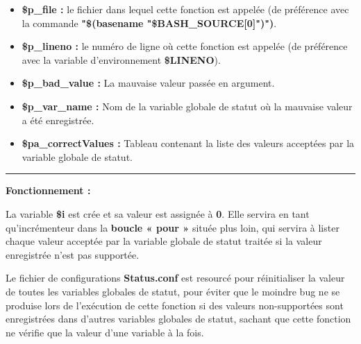 \documentclass[a4paper,10pt]{article}
\begin{document}
    \begin{justify}
        \begin{itemize}
            \item \textbf{\color{vars}\$p\_file\color{text} :} le fichier dans lequel cette fonction est appelée (de préférence avec la commande \textbf{\textbf{"\$(\color{cmds}basename \color{text}"\color{vars}\$BASH\_SOURCE[0]\color{text}")")}}.\setlength{\parskip}{1em}

            \item \textbf{\color{vars}\$p\_lineno\color{text} :} le numéro de ligne où cette fonction est appelée (de préférence avec la variable d'environnement \textbf{\color{vars}\$LINENO}).

            \item \textbf{\color{vars}\$p\_bad\_value\color{text} :} La mauvaise valeur passée en argument\color{text}.

            \item \textbf{\color{vars}\$p\_var\_name\color{text} :}  Nom de la variable globale de statut où la mauvaise valeur a été enregistrée.\color{text}

            \item \textbf{\color{vars}\$pa\_correctValues\color{text} :} Tableau contenant la liste des valeurs acceptées par la variable globale de statut.
        \end{itemize}
    \end{justify}

    \par\noindent\rule{\textwidth}{0.4pt}

    \begin{justify}
        \textbf{Fonctionnement :}

        La variable \textbf{\color{vars}\$i} est crée et sa valeur est assignée à \textbf{0}. Elle servira en tant qu'incrémenteur dans la \textbf{\color{loop}boucle « pour »} située plus loin, qui servira à lister chaque valeur acceptée par la variable globale de statut traitée si la valeur enregistrée n'est pas supportée.
    \end{justify}

    \setlength{\parskip}{2em}

    \begin{justify}
        Le fichier de configurations \textbf{\color{path}Status.conf} est resourcé pour réinitialiser la valeur de toutes les variables globales de statut, pour éviter que le moindre bug ne se produise lors de l'exécution de cette fonction si des valeurs non-supportées sont enregistrées dans d'autres variables globales de statut, sachant que cette fonction ne vérifie que la valeur d'une variable à la fois.
    \end{justify}
\end{document}
